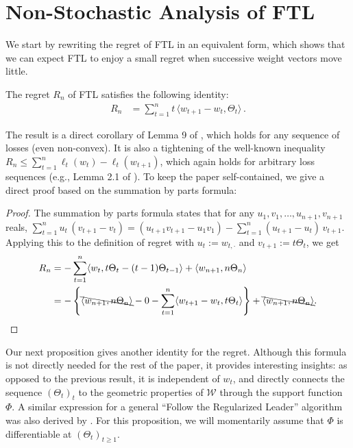 \documentclass[english]{article}
\newcommand{\cW}{\mathcal{W}}
\newcommand{\ip}[1]{\langle#1\rangle}
\begin{document}
\section{Non-Stochastic Analysis of FTL}
\label{sec:FTL}
We start by rewriting the regret of FTL in an equivalent form, which shows that we can expect FTL to enjoy a small
regret when successive weight vectors move little. 
\begin{proposition}
\label{prop:regretabel}
The regret $R_n$ of FTL satisfies the following identity:
\begin{align*}
R_n & =  \sum_{t=1}^n t\,\ip{ w_{t+1}-w_t,\Theta_t}  \,.
\end{align*}
\end{proposition}
The result is a direct corollary of Lemma 9 of \citet{McMahan10:Equiv}, which holds 
for any sequence of losses (even non-convex).
It is also a tightening of the well-known inequality $R_n \le \sum_{t=1}^n \ell_t(w_t)-\ell_t(w_{t+1})$,
which again holds for arbitrary loss sequences (e.g., Lemma 2.1 of \citealp{SS12:Book}).
To keep the paper self-contained, we give a direct proof based on the summation by parts formula:
\begin{proof}
The summation by parts formula states that for any $u_1,v_1,\dots,u_{n+1},v_{n+1}$ reals,
$
\sum_{t=1}^n u_t\,(v_{t+1}-v_t) = (u_{t+1}v_{t+1}-u_1 v_1) - \sum_{t=1}^n (u_{t+1}-u_t)\,v_{t+1} 
$.
Applying this to the definition of regret
with $u_t:=w_{t,\cdot}$ and $v_{t+1} := t\Theta_{t}$, we get
\begin{align*}
R_n 
& = -\sum_{t=1}^n \ip{w_t,t\Theta_t - (t-1)\Theta_{t-1}} + \ip{w_{n+1},n\Theta_n}   \\
& = - \left\{ 
		\bcancel{\ip{w_{n+1},n\Theta_n}} - 0 - \sum_{t=1}^n \ip{w_{t+1}-w_t,t\Theta_t}  \right\} +
		\bcancel{\ip{w_{n+1},n\Theta_n}}.
\end{align*}
\end{proof}

Our next proposition gives another identity for the regret.
Although this formula is not directly needed for the rest of the paper, it provides interesting insights:
as opposed to the previous result, it is independent of $w_t$, and 
directly connects the sequence $(\Theta_t)_t$ to the 
geometric properties of $\cW$ through the support function $\Phi$.
A similar expression for a general ``Follow the Regularized Leader'' algorithm was also derived by \citet{abernethy2014online}.
For this proposition, we will momentarily assume that $\Phi$ is differentiable at $(\Theta_t)_{t\ge 1}$.
\end{document}
